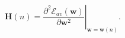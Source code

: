 \begin{equation}
\label{eq:hessian}
\mathbf{H}(\mathit{n}) = 
\left. \frac{\partial^2 \mathscr{E}_{av}(\mathbf{w})}{\partial
\mathbf{w}^2}\right|_{\mathbf{w}=\mathbf{w}(\mathit{n})} .
\end{equation}
